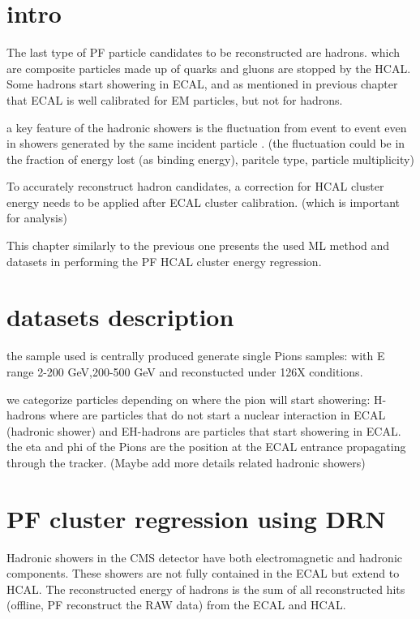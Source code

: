 \section{intro}

The last type of PF particle candidates to be reconstructed are hadrons. which are composite particles made up of quarks and gluons are stopped by the HCAL.
Some hadrons start showering in ECAL, and as mentioned in previous chapter that ECAL is well calibrated for EM particles, but not for hadrons.

a key feature of the hadronic showers is the fluctuation from event to event even in showers generated by the same incident particle . (the fluctuation could be in the fraction of energy lost (as binding energy), paritcle type, particle multiplicity) 

To accurately reconstruct hadron candidates, a correction for HCAL cluster energy needs to be applied after ECAL cluster calibration. (which is important for analysis) 

This chapter similarly to the previous one presents the used ML method and datasets in performing the PF HCAL cluster energy regression.

\section{datasets description}

the sample used is centrally produced generate single Pions samples: with E range 2-200 GeV,200-500 GeV and reconstucted under 126X conditions.

we categorize particles depending on where the pion will start showering: H-hadrons where are particles that do not start a nuclear interaction in ECAL (hadronic shower) and EH-hadrons are particles that start showering in ECAL. the eta and phi of the Pions are the position at the ECAL entrance propagating through the tracker. (Maybe add more details related hadronic showers)

\section{PF cluster regression using DRN}

Hadronic showers in the CMS detector have both electromagnetic and hadronic components. These showers are not fully contained in the ECAL but extend to HCAL. The reconstructed energy of hadrons is the sum of all reconstructed hits (offline, PF reconstruct the RAW data) from the ECAL and HCAL. 


